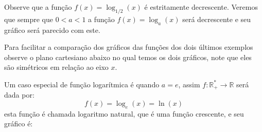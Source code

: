 \begin{exem}
 Observe que a função $f(x)= \log_{1/2}(x)$ é estritamente decrescente. Veremos que sempre que $0< a< 1$ a função $f(x)= \log_{a}(x)$ será decrescente e seu gráfico será parecido com este.
 \end{exem}

 Para facilitar a comparação dos gráficos das funções dos dois últimos exemplos observe o plano cartesiano abaixo no qual temos os dois gráficos, note que eles são simétricos em relação ao eixo $x$.



  \begin{exem} \label{ex:log-e}
   Um caso especial de função logarítmica é quando $a= e$, assim $f: \mathbb{R_{+}^{*}} \rightarrow \mathbb{R} $ será dada por:
\begin{equation*}
f(x) = \log_{e}(x)= \ln(x)
\end{equation*}
  esta função é chamada logaritmo natural, que é uma função crescente, e seu gráfico é:

   \begin{center}
    \end{center}

 \end{exem}

